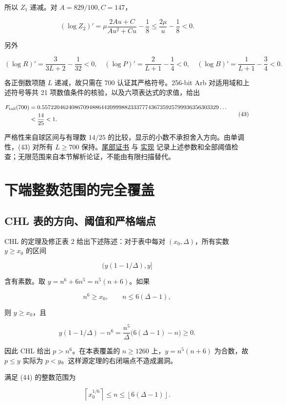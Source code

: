\documentclass[UTF8,zihao=-4,fontset=fandol]{ctexart}
\begin{document}
所以 \(Z_1\) 递减。对 \(A=829/100,C=147\)，

\[
(\log Z_2)'=\mu\frac{2Au+C}{Au^2+Cu}-\frac18
\le\frac{2\mu}{u}-\frac18<0.
\]

另外

\[
(\log R)'=\frac3{3L+2}-\frac1{32}<0,\quad
(\log P)'=\frac2{L+1}-\frac14<0,\quad
(\log B)'=\frac1{L+1}-\frac34<0.
\]

各正倒数项随 \(L\) 递减，故只需在 700 认证其严格符号。256-bit Arb 对适用域和上述符号等共 21 项数值条件的核验，以及六项表达式的求值，给出

\[
\begin{aligned}
F_{\rm tail}(700)
&=0.557220462408670948864420999882333777436735925799936356303329\ldots\\
&<\frac{14}{25}<1.
\end{aligned} \tag{43}
\]

严格性来自球区间与有理数 \(14/25\) 的比较，显示的小数不承担舍入方向。由单调性，(43) 对所有 \(L\ge700\) 保持。\href{../results/tail_cs_certificate.json}{尾部证书} 与 \href{../code/certify_tail_cs.py}{实现} 记录上述参数和全部阈值检查；无限范围来自本节解析论证，不能由有限扫描替代。

\section{下端整数范围的完全覆盖}

\subsection{CHL 表的方向、阈值和严格端点}

CHL 的定理及修正表 2 给出下述陈述：对于表中每对 \((x_0,\Delta)\)，所有实数 \(y\ge x_0\) 的区间

\[
\bigl(y(1-1/\Delta),y\bigr]
\]

含有素数。取 \(y=n^6+6n^5=n^5(n+6)\)。如果

\[
n^6\ge x_0,\qquad n\le6(\Delta-1), \tag{44}
\]

则 \(y\ge x_0\)，且

\[
y(1-1/\Delta)-n^6
=\frac{n^5}{\Delta}\bigl(6(\Delta-1)-n\bigr)\ge0.
\]

因此 CHL 给出 \(p>n^6\)。在本表覆盖的 \(n\ge1260\) 上，\(y=n^5(n+6)\) 为合数，故 \(p\le y\) 实际为 \(p<y\)。这样源定理的右闭端点不造成漏洞。

满足 (44) 的整数范围为

\[
\left\lceil x_0^{1/6}\right\rceil
\le n\le\left\lfloor6(\Delta-1)\right\rfloor.
\]
\end{document}
